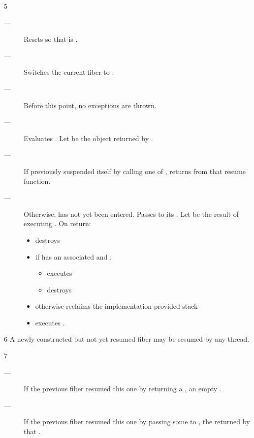 5 \effects
\begin{description}
    \item[---] Resets \state so that \emptyfn is \true.
    \item[---] Switches the current fiber to .
    \item[---] Before this point, no exceptions are thrown.
    \item[---] Evaluates .
               Let  be the \fiber object returned by .
    \item[---] If  previously
               suspended itself by calling one of \anyresume,
               returns  from that resume function.
    \item[---] Otherwise,  has not yet been entered.
               Passes  to its \entryfn.
               Let \continuation be the result of executing
               . On return:
        \begin{itemize}
            \item destroys 
            \item if  has an associated  and :
                \begin{itemize}
                    \item executes 
                    \item destroys 
                \end{itemize}
            \item otherwise reclaims the implementation-provided stack
            \item executes \resume[continuation].
        \end{itemize}
\end{description}

6 \remarks
A newly constructed but not yet resumed fiber may be resumed by
any thread.

7 \returns
\begin{description}
    \item[---] If the previous fiber resumed this one by returning a \fiber,
               an empty \fiber.
    \item[---] If the previous fiber resumed this one by passing some 
               to \anyresumewith, the \fiber returned by that .
\end{description}

